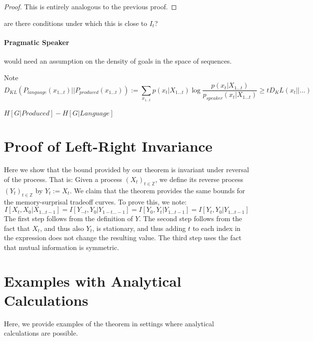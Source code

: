 \documentclass[11pt,letterpaper]{article}
\newcounter{theorem}
\begin{document}
\begin{proof}
This is entirely analogous to the previous proof.
\end{proof}


are there conditions under which this is close to $I_t$?

\paragraph{Pragmatic Speaker}

would need an assumption on the density of goals in the space of sequences.


Note 
\begin{equation}
	D_{KL}(P_{language}(x_{1\dots t})||P_{produced}(x_{1\dots t}))  := \sum_{x_{1\dots t}} p(x_t|X_{1\dots t}) \log \frac{p(x_t|X_{1\dots t})}{p_{speaker}(x_t|X_{1\dots t})} \geq t D_KL(x_t||...)
\end{equation}

$H[G|Produced] - H[G|Language]$



\section{Proof of Left-Right Invariance}

Here we show that the bound provided by our theorem is invariant under reversal of the process.
That is: Given a process $(X_t)_{t \in \mathbb{Z}}$, we define its reverse process $(Y_t)_{t \in \mathbb{Z}}$ by $Y_t := X_t$.
We claim that the theorem provides the same bounds for the memory-surprisal tradeoff curves.
To prove this, we note:
\begin{equation}
	I[X_t, X_0|X_{1\dots t-1}] = I[Y_{-t}, Y_0|Y_{1-t\dots -1}] = I[Y_0, Y_t|Y_{1\dots t-1}] = I[Y_t, Y_0|Y_{1\dots t-1}]
\end{equation}
The first step follows from the definition of $Y$. The second step follows from the fact that $X_t$, and thus also $Y_t$, is stationary, and thus adding $t$ to each index in the expression does not change the resulting value. The third step uses the fact that mutual information is symmetric.


\section{Examples with Analytical Calculations}

Here, we provide examples of the theorem in settings where analytical calculations are possible.
\end{document}
